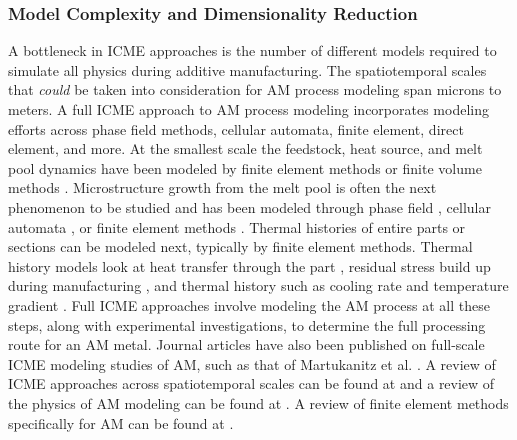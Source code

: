 \subsubsection{Model Complexity and Dimensionality Reduction}
A bottleneck in ICME approaches is the number of different models required to simulate all physics during additive manufacturing. The spatiotemporal scales that \textit{could} be taken into consideration for AM process modeling span microns to meters. A full ICME approach to AM process modeling incorporates modeling efforts across phase field methods, cellular automata, finite element, direct element, and more. At the smallest scale the feedstock, heat source, and melt pool dynamics have been modeled by finite element methods \cite{Toyserkani2004, Khairallah2016, Manvatkar2014} or finite  volume methods \cite{Dai2014}. Microstructure growth from the melt pool is often the next phenomenon to be studied and has been modeled through phase field \cite{Chen2002, Gong2015, Kundin2015, Sahoo2016}, cellular automata \cite{Tan2011}, or finite element methods \cite{Nie2014}. Thermal histories of entire parts or sections can be modeled next, typically by finite element methods. Thermal history models look at heat transfer through the part \cite{Michaleris2014}, residual stress build up during manufacturing \cite{Pal2014, Ding2011}, and thermal history such as cooling rate and temperature gradient \cite{Li2014, Raghavan2016}. Full ICME approaches involve modeling the AM process at all these steps, along with experimental investigations, to determine the full processing route for an AM metal. Journal articles have also been published on full-scale ICME modeling studies of AM, such as that of Martukanitz et al. \cite{Martukanitz2014}. A review of ICME approaches across spatiotemporal scales can be found at \cite{Francois2017} and a review of the physics of AM modeling can be found at \cite{King2015a}. A review of finite element methods specifically for AM can be found at \cite{Gouge2018}. 

